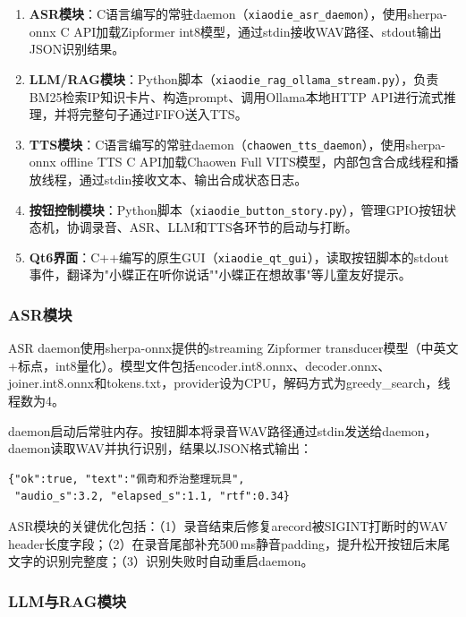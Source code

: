 \documentclass[lettersize,journal]{IEEEtran}
\begin{document}
\begin{enumerate}[leftmargin=*]
    \item \textbf{ASR模块}：C语言编写的常驻daemon（\texttt{xiaodie\_asr\_daemon}），使用sherpa-onnx C API加载Zipformer int8模型，通过stdin接收WAV路径、stdout输出JSON识别结果。
    \item \textbf{LLM/RAG模块}：Python脚本（\texttt{xiaodie\_rag\_ollama\_stream.py}），负责BM25检索IP知识卡片、构造prompt、调用Ollama本地HTTP API进行流式推理，并将完整句子通过FIFO送入TTS。
    \item \textbf{TTS模块}：C语言编写的常驻daemon（\texttt{chaowen\_tts\_daemon}），使用sherpa-onnx offline TTS C API加载Chaowen Full VITS模型，内部包含合成线程和播放线程，通过stdin接收文本、输出合成状态日志。
    \item \textbf{按钮控制模块}：Python脚本（\texttt{xiaodie\_button\_story.py}），管理GPIO按钮状态机，协调录音、ASR、LLM和TTS各环节的启动与打断。
    \item \textbf{Qt6界面}：C++编写的原生GUI（\texttt{xiaodie\_qt\_gui}），读取按钮脚本的stdout事件，翻译为"小蝶正在听你说话""小蝶正在想故事"等儿童友好提示。
\end{enumerate}

\subsubsection{ASR模块}

ASR daemon使用sherpa-onnx提供的streaming Zipformer transducer模型（中英文+标点，int8量化）。模型文件包括encoder.int8.onnx、decoder.onnx、joiner.int8.onnx和tokens.txt，provider设为CPU，解码方式为greedy\_search，线程数为4。

daemon启动后常驻内存。按钮脚本将录音WAV路径通过stdin发送给daemon，daemon读取WAV并执行识别，结果以JSON格式输出：

\begin{lstlisting}[language={}]
{"ok":true, "text":"佩奇和乔治整理玩具",
 "audio_s":3.2, "elapsed_s":1.1, "rtf":0.34}
\end{lstlisting}

ASR模块的关键优化包括：（1）录音结束后修复arecord被SIGINT打断时的WAV header长度字段；（2）在录音尾部补充500\,ms静音padding，提升松开按钮后末尾文字的识别完整度；（3）识别失败时自动重启daemon。

\subsubsection{LLM与RAG模块}
\end{document}
